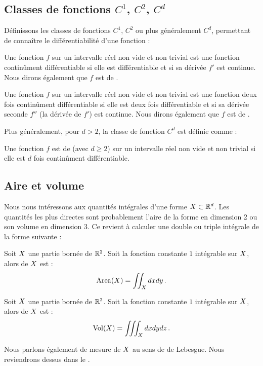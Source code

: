 \subsection{Classes de fonctions $C^1$, $C^2$, $C^d$}
%
Définissons les classes de fonctions $C^1$, $C^2$ ou plus généralement
$C^d$, permettant de connaître le différentiabilité d'une fonction :
%
\begin{definition}{}
  Une fonction $f$ sur un intervalle réel non vide et non trivial est une
  fonction continûment différentiable si elle est différentiable et si sa
  dérivée $f'$ est continue. Nous dirons également que $f$ est de
  .
\end{definition}
%
\begin{definition}{}
  Une fonction $f$ sur un intervalle réel non vide et non trivial est une
  fonction deux fois continûment différentiable si elle est deux fois
  différentiable et si sa dérivée seconde $f''$ (la dérivée de $f'$) est
  continue. Nous dirons également que $f$ est de .
\end{definition}
%
Plus généralement, pour $d>2$, la classe de fonction $C^d$ est définie comme :
%
\begin{definition}{}
  Une fonction $f$ est de  (avec $d \ge 2$) sur un
  intervalle réel non vide et non trivial si elle est $d$ fois continûment
  différentiable.
\end{definition}
%
\subsection{Aire et volume}
%
Nous nous intéressons aux quantités intégrales d'une forme $X \subset
\mathbb{R}^d$. Les quantités les plus directes sont probablement l'aire de la forme en
dimension 2 ou son volume en dimension 3. Ce revient à calculer une double ou
triple intégrale de la forme suivante :
%
\begin{definition}{}
  Soit $X$ une partie bornée de $\mathbb{R}^2$. Soit la fonction constante $1$
  intégrable sur $X$, alors  de $X$ est :
  \begin{equation}
    \label{eq:aire}
    \mathrm{Area}(X) = \iint_{X} dxdy \,.
  \end{equation}
\end{definition}
%
\begin{definition}{}
  Soit $X$ une partie bornée de $\mathbb{R}^3$. Soit la fonction constante $1$
  intégrable sur $X$, alors  de $X$ est :
  \begin{equation}
    \label{eq:volume}
    \mathrm{Vol}(X) = \iiint_{X} dxdydz \,.
  \end{equation}
\end{definition}
%
Nous parlons également de mesure de $X$ au sens de de Lebesgue. Nous
reviendrons dessus dans le .
%
